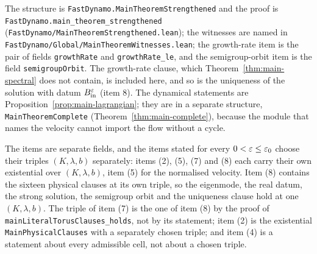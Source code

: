 The structure is \texttt{FastDynamo.MainTheoremStrengthened} and the proof is
\texttt{FastDynamo.main\_theorem\_strengthened}
(\texttt{FastDynamo/MainTheoremStrengthened.lean}); the witnesses are named in
\texttt{FastDynamo/Global/MainTheoremWitnesses.lean}; the growth-rate item is
the pair of fields \texttt{growthRate} and \texttt{growthRate\_le}, and the semigroup-orbit
item is the field \texttt{semigroupOrbit}.  The
growth-rate clause, which Theorem~\ref{thm:main-spectral} does not contain, is included here,
and so is the uniqueness of the solution with datum $B_{\rm in}^\varepsilon$ (item 8).  The dynamical
statements are Proposition~\ref{prop:main-lagrangian}; they are in a separate structure,
\texttt{MainTheoremComplete} (Theorem~\ref{thm:main-complete}), because the module that names
the velocity cannot import the flow without a cycle.

The items are separate fields, and the items stated for every $0<\varepsilon\leq\varepsilon_0$ choose their
triples $(K,\lambda,b)$ separately: items (2), (5), (7) and (8) each carry their own
existential over $(K,\lambda,b)$, item (5) for the normalised velocity.  Item (8) contains the sixteen physical clauses at its own triple, so the
eigenmode, the real datum, the strong solution, the semigroup orbit and the uniqueness clause
hold at one $(K,\lambda,b)$.  The triple of item (7) is the one of item (8) by the proof of
\texttt{mainLiteralTorusClauses\_holds}, not by its statement; item (2) is the existential
\texttt{MainPhysicalClauses} with a separately chosen triple; and item (4) is a statement about
every admissible cell, not about a chosen triple.

